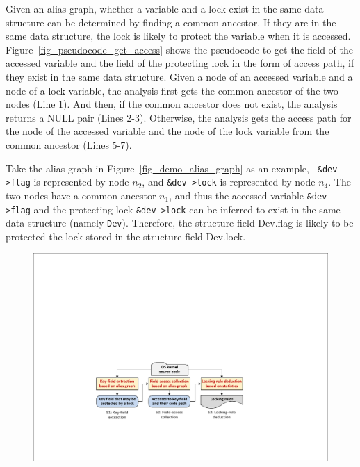 Given an alias graph, whether a variable and a lock exist in the same data 
structure can be determined by finding a common ancestor. If they are in the 
same data structure, the lock is likely to protect the variable when it is 
accessed. Figure~\ref{fig_pseudocode_get_access} shows the pseudocode to 
get the field of the accessed variable and the field of the protecting lock in 
the form of access path, if they exist in the same data structure. Given a node 
of an accessed variable and a node of a lock variable, the analysis first gets 
the common ancestor of the two nodes (Line 1). And then, if the common ancestor 
does not exist, the analysis returns a NULL pair (Lines 2-3). Otherwise, the 
analysis gets the access path for the node of the accessed variable and the 
node of the lock variable from the common ancestor (Lines 5-7).

Take the alias graph in Figure~\ref{fig_demo_alias_graph} as an example, {\tt 
\&dev->flag} is represented by node $\mathit{n_2}$, and {\tt \&dev->lock} is 
represented by node $\mathit{n_4}$. The two nodes have a common ancestor 
$\mathit{n_1}$, and thus the accessed variable {\tt \&dev->flag} and the 
protecting lock {\tt \&dev->lock} can be inferred to exist in the same data 
structure (namely {\tt Dev}). Therefore, the structure field Dev.flag is likely 
to be protected the lock stored in the structure field Dev.lock.

\begin{figure}[htbp]
	\centering
	\includegraphics[width=1\linewidth]{figures/fig_workflow.pdf}
	\label{fig_workflow}
\end{figure}

